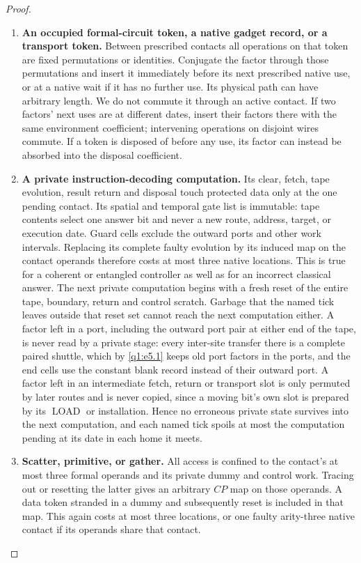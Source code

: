 \begin{proof}
\begin{enumerate}[label=\textup{Case \arabic*.},leftmargin=*]
\item \textbf{An occupied formal-circuit token, a native gadget record, or a transport token.} Between prescribed contacts all operations on that token are fixed permutations or identities. Conjugate the factor through those permutations and insert it immediately before its next prescribed native use, or at a native wait if it has no further use. Its physical path can have arbitrary length. We do not commute it through an active contact. If two factors' next uses are at different dates, insert their factors there with the same environment coefficient; intervening operations on disjoint wires commute. If a token is disposed of before any use, its factor can instead be absorbed into the disposal coefficient.
\item \textbf{A private instruction-decoding computation.} Its clear, fetch, tape evolution, result return and disposal touch protected data only at the one pending contact. Its spatial and temporal gate list is immutable: tape contents select one answer bit and never a new route, address, target, or execution date. Guard cells exclude the outward ports and other work intervals. Replacing its complete faulty evolution by its induced map on the contact operands therefore costs at most three native locations. This is true for a coherent or entangled controller as well as for an incorrect classical answer. The next private computation begins with a fresh reset of the entire tape, boundary, return and control scratch. Garbage that the named tick leaves outside that reset set cannot reach the next computation either. A factor left in a port, including the outward port pair at either end of the tape, is never read by a private stage: every inter-site transfer there is a complete paired shuttle, which by \eqref{q1:e5.1} keeps old port factors in the ports, and the end cells use the constant blank record instead of their outward port. A factor left in an intermediate fetch, return or transport slot is only permuted by later routes and is never copied, since a moving bit's own slot is prepared by its \(\operatorname{LOAD}\) or installation. Hence no erroneous private state survives into the next computation, and each named tick spoils at most the computation pending at its date in each home it meets.
\item \textbf{Scatter, primitive, or gather.} All access is confined to the contact's at most three formal operands and its private dummy and control work. Tracing out or resetting the latter gives an arbitrary \(CP\) map on those operands. A data token stranded in a dummy and subsequently reset is included in that map. This again costs at most three locations, or one faulty arity-three native contact if its operands share that contact.

\end{enumerate}
\end{proof}
